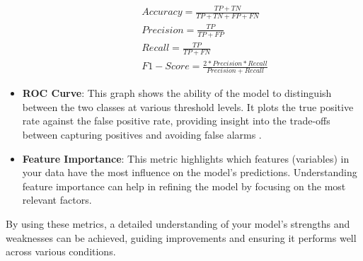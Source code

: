\begin{itemize}
\begin{itemize}
        \begin{align} 
            &\mathit{Accuracy} = \frac{TP+TN}{TP+TN+FP+FN} \label{accuracy}\\
            &\mathit{Precision} = \frac{TP}{TP+FP} \label{precision}\\
            &\mathit{Recall} = \frac{TP}{TP+FN} \label{recall}\\
            &F1-Score = \frac{2*\mathit{Precision}*\mathit{Recall}}{\mathit{Precision}+\mathit{Recall} \label{f1}}
        \end{align}
    \end{itemize}
       \item \textbf{ROC Curve}: This graph shows the ability of the model to distinguish between the two classes at various threshold levels. It plots the true positive rate against the false positive rate, providing insight into the trade-offs between capturing positives and avoiding false alarms \cite{hoo2017roc}.
    \item \textbf{Feature Importance}: This metric highlights which features (variables) in your data have the most influence on the model’s predictions. Understanding feature importance can help in refining the model by focusing on the most relevant factors.
\end{itemize}

By using these metrics, a detailed understanding of your model's strengths and weaknesses can be achieved, guiding improvements and ensuring it performs well across various conditions.